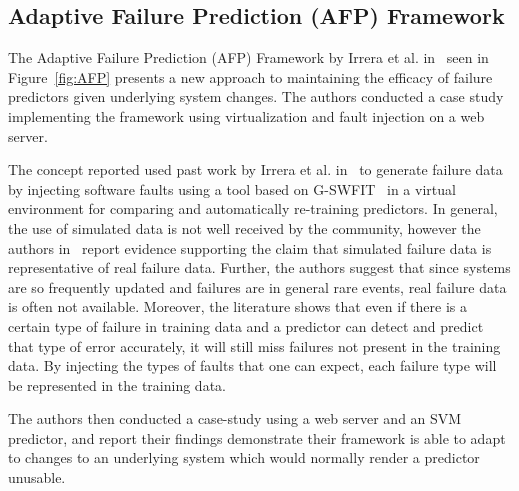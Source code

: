 \subsection{Adaptive Failure Prediction (AFP) Framework} \label{afp}
The Adaptive Failure Prediction (AFP) Framework by Irrera et al. in~\cite{irrera2015} seen in Figure~\ref{fig:AFP} presents a new approach to maintaining the efficacy of failure predictors given underlying system changes.  The authors conducted a case study implementing the framework using virtualization and fault injection on a web server.  

\figAFP

The concept reported used past work by Irrera et al. in~\cite{irrera2013,irrera2014} to generate failure data by injecting software faults using a tool based on G-SWFIT~\cite{gswfit} in a virtual environment for comparing and automatically re-training predictors.  In general, the use of simulated data is not well received by the community, however the authors in~\cite{irrera2010,irrera2014} report evidence supporting the claim that simulated failure data is representative of real failure data.  Further, the authors suggest that since systems are so frequently updated and failures are in general rare events, real failure data is often not available.  Moreover, the literature shows that even if there is a certain type of failure in training data and a predictor can detect and predict that type of error accurately, it will still miss failures not present in the training data.  By injecting the types of faults that one can expect, each failure type will be represented in the training data.

The authors then conducted a case-study using a web server and an SVM predictor, and report their findings demonstrate their framework is able to adapt to changes to an underlying system which would normally render a predictor unusable.  
